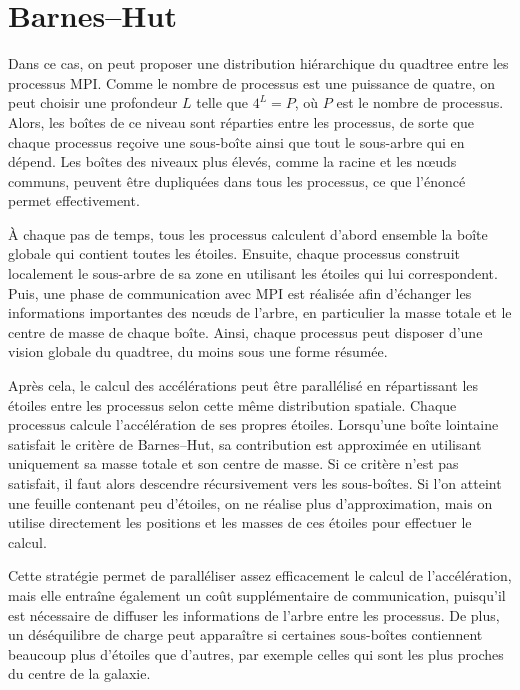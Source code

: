 \section{Barnes--Hut}
Dans ce cas, on peut proposer une distribution hiérarchique du quadtree entre les processus MPI. Comme le nombre de processus est une puissance de quatre, on peut choisir une profondeur \(L\) telle que \(4^L = P\), où \(P\) est le nombre de processus. Alors, les boîtes de ce niveau sont réparties entre les processus, de sorte que chaque processus reçoive une sous-boîte ainsi que tout le sous-arbre qui en dépend. Les boîtes des niveaux plus élevés, comme la racine et les nœuds communs, peuvent être dupliquées dans tous les processus, ce que l’énoncé permet effectivement.

À chaque pas de temps, tous les processus calculent d’abord ensemble la boîte globale qui contient toutes les étoiles. Ensuite, chaque processus construit localement le sous-arbre de sa zone en utilisant les étoiles qui lui correspondent. Puis, une phase de communication avec MPI est réalisée afin d’échanger les informations importantes des nœuds de l’arbre, en particulier la masse totale et le centre de masse de chaque boîte. Ainsi, chaque processus peut disposer d’une vision globale du quadtree, du moins sous une forme résumée.

Après cela, le calcul des accélérations peut être parallélisé en répartissant les étoiles entre les processus selon cette même distribution spatiale. Chaque processus calcule l’accélération de ses propres étoiles. Lorsqu’une boîte lointaine satisfait le critère de Barnes--Hut, sa contribution est approximée en utilisant uniquement sa masse totale et son centre de masse. Si ce critère n’est pas satisfait, il faut alors descendre récursivement vers les sous-boîtes. Si l’on atteint une feuille contenant peu d’étoiles, on ne réalise plus d’approximation, mais on utilise directement les positions et les masses de ces étoiles pour effectuer le calcul.

Cette stratégie permet de paralléliser assez efficacement le calcul de l’accélération, mais elle entraîne également un coût supplémentaire de communication, puisqu’il est nécessaire de diffuser les informations de l’arbre entre les processus. De plus, un déséquilibre de charge peut apparaître si certaines sous-boîtes contiennent beaucoup plus d’étoiles que d’autres, par exemple celles qui sont les plus proches du centre de la galaxie.

